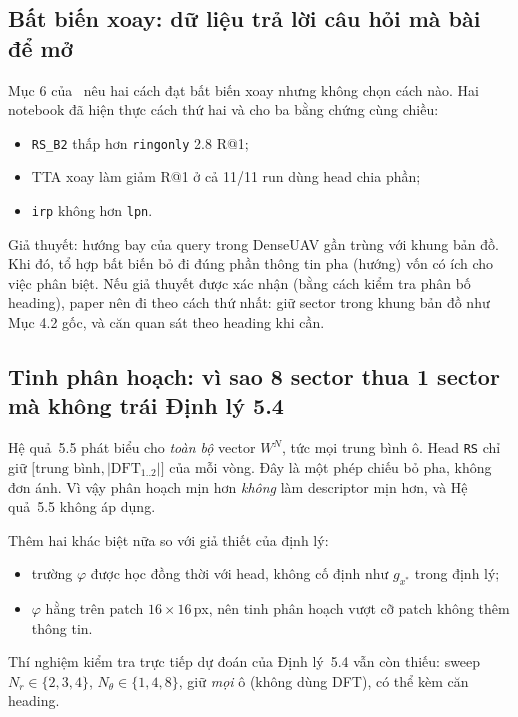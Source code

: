 \documentclass[11pt,a4paper]{article}
\newcommand{\run}[1]{\texttt{#1}}
\begin{document}
\subsection{Bất biến xoay: dữ liệu trả lời câu hỏi mà bài để mở}
Mục 6 của~\cite{huu2026} nêu hai cách đạt bất biến xoay nhưng không chọn cách nào. Hai notebook đã hiện thực cách thứ hai và cho ba bằng chứng cùng chiều:
\begin{itemize}
\item \run{RS\_B2} thấp hơn \run{ringonly} 2.8 R@1;
\item TTA xoay làm giảm R@1 ở cả 11/11 run dùng head chia phần;
\item \run{irp} không hơn \run{lpn}.
\end{itemize}
Giả thuyết: hướng bay của query trong DenseUAV gần trùng với khung bản đồ. Khi đó, tổ hợp bất biến bỏ đi đúng phần thông tin pha (hướng) vốn có ích cho việc phân biệt. Nếu giả thuyết được xác nhận (bằng cách kiểm tra phân bố heading), paper nên đi theo cách thứ nhất: giữ sector trong khung bản đồ như Mục 4.2 gốc, và căn quan sát theo heading khi cần.

\subsection{Tinh phân hoạch: vì sao 8 sector thua 1 sector mà không trái Định lý 5.4}
Hệ quả~5.5 phát biểu cho \emph{toàn bộ} vector $W^N$, tức mọi trung bình ô. Head \run{RS} chỉ giữ $\big[\text{trung bình},|\mathrm{DFT}_{1..2}|\big]$ của mỗi vòng. Đây là một phép chiếu bỏ pha, không đơn ánh. Vì vậy phân hoạch mịn hơn \emph{không} làm descriptor mịn hơn, và Hệ quả~5.5 không áp dụng.

Thêm hai khác biệt nữa so với giả thiết của định lý:
\begin{itemize}
\item trường $\varphi$ được học đồng thời với head, không cố định như $g_{x^*}$ trong định lý;
\item $\varphi$ hằng trên patch $16\times16$\,px, nên tinh phân hoạch vượt cỡ patch không thêm thông tin.
\end{itemize}
Thí nghiệm kiểm tra trực tiếp dự đoán của Định lý~5.4 vẫn còn thiếu: sweep $N_r\in\{2,3,4\}$, $N_\theta\in\{1,4,8\}$, giữ \emph{mọi} ô (không dùng DFT), có thể kèm căn heading.
\end{document}
